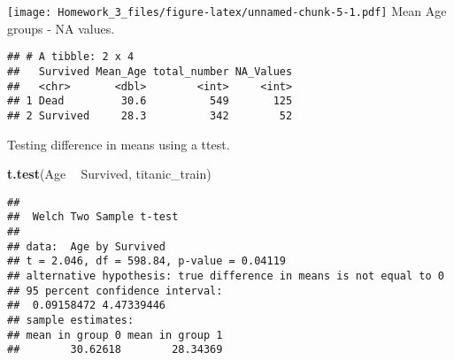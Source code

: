 \documentclass[]{article}
\newenvironment{Shaded}{\begin{snugshade}}{\end{snugshade}}
\newcommand{\DataTypeTok}[1]{\textcolor[rgb]{0.13,0.29,0.53}{#1}}
\newcommand{\KeywordTok}[1]{\textcolor[rgb]{0.13,0.29,0.53}{\textbf{#1}}}
\newcommand{\NormalTok}[1]{#1}
\newcommand{\OperatorTok}[1]{\textcolor[rgb]{0.81,0.36,0.00}{\textbf{#1}}}
\newcommand{\OtherTok}[1]{\textcolor[rgb]{0.56,0.35,0.01}{#1}}
\newcommand{\StringTok}[1]{\textcolor[rgb]{0.31,0.60,0.02}{#1}}
\begin{document}
\texttt{[image: Homework\_3\_files/figure-latex/unnamed-chunk-5-1.pdf]}
Mean Age groups - NA values.

\begin{Shaded}
\end{Shaded}

\begin{verbatim}
## # A tibble: 2 x 4
##   Survived Mean_Age total_number NA_Values
##   <chr>       <dbl>        <int>     <int>
## 1 Dead         30.6          549       125
## 2 Survived     28.3          342        52
\end{verbatim}

Testing difference in means using a ttest.

\begin{Shaded}
\begin{Highlighting}[]
\KeywordTok{t.test}\NormalTok{(Age }\OperatorTok{~}\StringTok{ }\NormalTok{Survived, titanic_train)}
\end{Highlighting}
\end{Shaded}

\begin{verbatim}
## 
##  Welch Two Sample t-test
## 
## data:  Age by Survived
## t = 2.046, df = 598.84, p-value = 0.04119
## alternative hypothesis: true difference in means is not equal to 0
## 95 percent confidence interval:
##  0.09158472 4.47339446
## sample estimates:
## mean in group 0 mean in group 1 
##        30.62618        28.34369
\end{verbatim}
\end{document}
